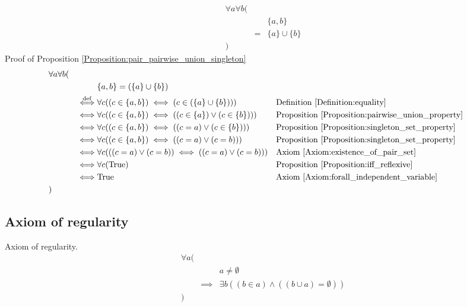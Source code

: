 \begin{prop}
\label{Proposition:pair_pairwise_union_singleton}
\begin{align*}
& \forall a \forall b ( \\
& & & \{ a , b \} \\
& & = & \{ a \} \cup \{ b \} \\
& )
\end{align*}
Proof of Proposition \ref{Proposition:pair_pairwise_union_singleton}
\begin{align*}
& \forall a \forall b ( \\
& & & \{ a , b \} = (\{ a \} \cup \{ b \}) \\
& & \overset{\operatorname{def}}{\iff} & \forall c ((c \in \{ a , b \}) \iff (c \in (\{ a \} \cup \{ b \})))
& & \text{Definition \ref{Definition:equality}} \\
& & \iff & \forall c ((c \in \{ a , b \}) \iff ((c \in \{ a \}) \lor (c \in \{ b \})))
& & \text{Proposition \ref{Proposition:pairwise_union_property}} \\
& & \iff & \forall c ((c \in \{ a , b \}) \iff ((c = a) \lor (c \in \{ b \})))
& & \text{Proposition \ref{Proposition:singleton_set_property}} \\
& & \iff & \forall c ((c \in \{ a , b \}) \iff ((c = a) \lor (c = b)))
& & \text{Proposition \ref{Proposition:singleton_set_property}} \\
& & \iff & \forall c (((c = a) \lor (c = b)) \iff ((c = a) \lor (c = b)))
& & \text{Axiom \ref{Axiom:existence_of_pair_set}} \\
& & \iff & \forall c (\text{True})
& & \text{Proposition \ref{Proposition:iff_reflexive}} \\
& & \iff & \text{True}
& & \text{Axiom \ref{Axiom:forall_independent_variable}} \\
& )
\end{align*}
\end{prop}

\subsection{Axiom of regularity}
\begin{axm}
\label{Axiom:axiom_of_regularity}
Axiom of regularity.
\begin{align*}
& \forall a ( \\
& & & a \neq \emptyset \\
& & \implies & \exists b ((b \in a) \land ((b \cup a) = \emptyset)) \\
& )
\end{align*}
\end{axm}

